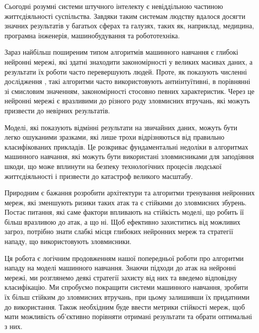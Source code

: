 \documentclass[14pt,a4paper]{extarticle}
\newcounter{e}
\numberwithin{equation}{section}
\numberwithin{figure}{section}
\begin{document}
Сьогодні розумні системи штучного інтелекту є невіддільною частиною життєдіяльності суспільства. Завдяки таким системам людству вдалося досягти значних результатів у багатьох сферах та галузях, таких як, наприклад, медицина, програмна інженерія, машинобудування та робототехніка.

Зараз найбільш поширеним типом алгоритмів машинного навчання є глибокі нейронні мережі, які здатні знаходити закономірності у великих масивах даних, а результати їх роботи часто перевершують людей. Проте, як показують численні дослідження \cite{first-work}, такі алгоритми часто використовують антиінтуїтивні, в порівнянні зі смисловим значенням, закономірності стосовно певних характеристик. Через це нейронні мережі є вразливими до різного роду зловмисних втручань, які можуть призвести до невірних результатів.

Моделі, які показують відмінні результати на звичайних даних, можуть бути легко ошуканими зразками, які лише трохи відрізняються від правильно класифікованих прикладів. Це розкриває фундаментальні недоліки в алгоритмах машинного навчання, які можуть бути використані зловмисниками для заподіяння шкоди, що може вплинути на безпеку технологічних процесів людської життєдіяльності і призвести до катастроф великого масштабу.

Природним є бажання розробити архітектури та алгоритми тренування нейронних мереж, які зменшують ризики таких атак та є стійкими до зловмисних збурень. Постає питання, які саме фактори впливають на стійкість моделі, що робить її більш вразливою до атак, а що ні. Щоб ефективно захиститись від можливих загроз, потрібно знати слабкі місця глибоких нейронних мереж та стратегії нападу, що використовують зловмисники.

Ця робота є логічним продовженням нашої попередньої роботи \cite{my-work} про алгоритми нападу на моделі машинного навчання. Знаючи підходи до атак на нейронні мережі, ми розглянемо деякі стратегії захисту від них та введемо відповідну класифікацію. Ми спробуємо покращити системи машинного навчання, зробити їх більш стійким до зловмисних втручань, при цьому залишивши їх придатними до використання. Також необхідним буде ввести метрики стійкості мереж, щоб мати можливість об'єктивно порівняти отримані результати та обрати оптимальні з них.

\end{document}
